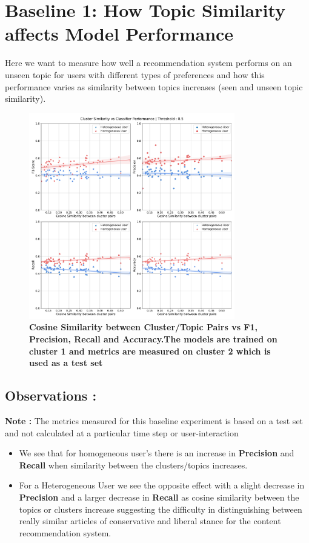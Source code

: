 \documentclass[a4paper,fontsize=8.0pt]{scrartcl}
\begin{document}
\newpage
\section{Baseline 1: How Topic Similarity affects Model Performance}
\begin{flushleft}
Here we want to measure how well a recommendation system performs on an unseen topic for users with different types of preferences and how this performance varies as similarity between topics increases (seen and unseen topic similarity).
\end{flushleft}
\vspace{-5ex}
\begin{figure}[H]
 \centering
 \includegraphics[width=0.8\textwidth]{Graphs/cluster_sim_vs_model_perf_5.pdf}
 \caption{\textbf{Cosine Similarity between Cluster/Topic Pairs vs F1, Precision, Recall and Accuracy.The models are trained on cluster 1 and metrics are measured on cluster 2 which is used as a test set}}
\end{figure}
\subsection{Observations :}
\begin{flushleft}
\textbf{Note :} The metrics measured for this baseline experiment is based on a test set and not calculated at a particular time step or user-interaction
\begin{itemize}
    \item We see that for homogeneous user's there is an increase in \textbf{Precision} and \textbf{Recall} when similarity between the clusters/topics increases.
    \item For a Heterogeneous User we see the opposite effect with a slight decrease in \textbf{Precision} and a larger decrease in \textbf{Recall} as cosine similarity between the topics or clusters increase suggesting the difficulty in distinguishing between really similar articles of conservative and liberal stance for the content recommendation system.
\end{itemize}
\end{flushleft}
\end{document}
